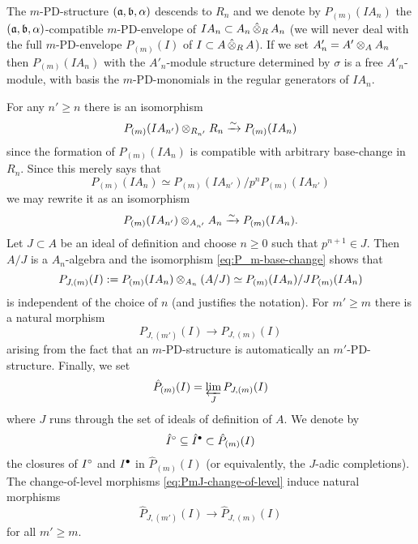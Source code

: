 \documentclass{article}
\theoremstyle{change}
\numberwithin{equation}{subsubsection}
\begin{document}
The $m$-PD-structure $({\mathfrak a},{\mathfrak b},\alpha)$ descends to $R_n$ and we
denote by $P_{(m)}(IA_n)$ the $({\mathfrak a},{\mathfrak b},\alpha)$-compatible
$m$-PD-envelope of $IA_n\subset A_n\mathop{\hat\otimes}_RA_n$ (we will never deal
with the full $m$-PD-envelope $P_{(m)}(I)$ of $I\subset A\mathop{\hat\otimes}_RA$).
If we set $A'_n=A'\otimes_AA_n$ then $P_{(m)}(IA_n)$ with the
$A'_n$-module structure determined by $\sigma$ is a free
$A'_n$-module, with basis the $m$-PD-monomials in the regular
generators of $IA_n$.

For any $n'\ge n$ there is an isomorphism
\begin{displaymath}
  P_{(m)}(IA_{n'})\otimes_{R_{n'}}R_n\xrightarrow{\sim} P_{(m)}(IA_n)
\end{displaymath}
since the formation of $P_{(m)}(IA_n)$ is compatible with arbitrary
base-change in $R_n$. Since this merely says that
\begin{displaymath}
  P_{(m)}(IA_n)\simeq P_{(m)}(IA_{n'})/p^nP_{(m)}(IA_{n'})
\end{displaymath}
we may rewrite it as an isomorphism
\begin{equation}
  \label{eq:P_m-base-change}
  P_{(m)}(IA_{n'})\otimes_{A_{n'}}A_n\xrightarrow{\sim} P_{(m)}(IA_n).
\end{equation}
Let $J\subset A$ be an ideal of definition and choose $n\ge0$ such
that $p^{n+1}\in J$. Then $A/J$ is a $A_n$-algebra and the isomorphism
\ref{eq:P_m-base-change} shows that
\begin{equation}
  \label{eq:P_A/R,J}
  P_{J,(m)}(I):=P_{(m)}(IA_n)\otimes_{A_n}(A/J)
  \simeq P_{(m)}(IA_n)/JP_{(m)}(IA_n)
\end{equation}
is independent of the choice of $n$ (and justifies the notation).
For $m'\ge m$ there is a natural morphism
\begin{equation}
  \label{eq:PmJ-change-of-level}
  P_{J,(m')}(I)\to P_{J,(m)}(I)
\end{equation}
arising from the fact that an $m$-PD-structure is automatically an
$m'$-PD-structure. Finally, we set
\begin{equation}
  \label{eq:P_A/R-hat}
  \hat P_{(m)}(I)=\varprojlim_J P_{J,(m)}(I)
\end{equation}
where $J$ runs through the set of ideals of definition of $A$. We
denote by 
\begin{equation}
  \label{eq:completion-of-canonical-m-PD-structure}
  \hat I^\circ\subseteq\hat I^\bullet\subset\hat P_{(m)}(I)
\end{equation}
the closures of $I^\circ$ and $I^\bullet$ in $\hat P_{(m)}(I)$ (or
equivalently, the $J$-adic completions). The change-of-level morphisms
\ref{eq:PmJ-change-of-level} induce natural morphisms
\begin{equation}
  \label{eq:hatPmJ-change-of-level}
  \hat P_{J,(m')}(I)\to \hat P_{J,(m)}(I)
\end{equation}
for all $m'\ge m$.
\end{document}

